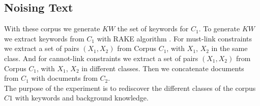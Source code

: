 \subsection{Noising Text}
With these corpus we generate $KW$ the set of keywords
for $C_1$.
To generate $KW$ we extract keywords from $C_1$ with RAKE algorithm \cite{rake}.
For must-link constraints we extract a set of pairs $(X_1, X_2)$ from Corpus
$C_1$, with $X_1$, $X_2$ in the same class.
And for cannot-link constraints we extract a set of pairs $(X_1, X_2)$ from Corpus
$C_1$, with $X_1$, $X_2$ in different classes.
Then we concatenate documents from $C_1$ with documents from $C_2$.\\
The purpose of the experiment is to rediscover the different classes of the
corpus $C1$ with keywords and background knowledge.
